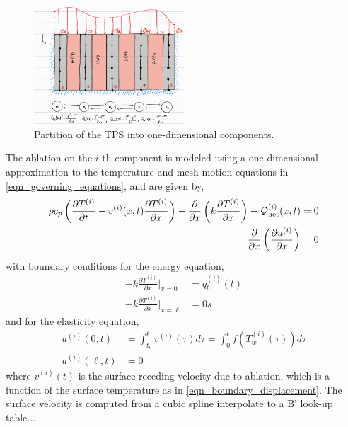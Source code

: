 \begin{figure}
    \centering
    \includegraphics[width=0.5\textwidth]{./figs/domain_partition.png}
    \caption{Partition of the TPS into one-dimensional components.}
    \label{fig_domain_partition}
\end{figure}

The ablation on the $i$-th component is modeled using a one-dimensional approximation to the temperature and mesh-motion equations in \cref{eqn_governing_equations}, and are given by,
\begin{subequations}
    \begin{align}
        \rho c_p\left(\frac{\partial T^{(i)}}{\partial t} - v^{(i)}(x,t)\frac{\partial T^{(i)}}{\partial x}\right) - \frac{\partial}{\partial x}\left(k\frac{\partial T^{(i)}}{\partial x}\right) - \mathcal{Q}^{(i)}_{\text{net}}(x,t) &= 0\label{eqn_thermal_1d}\\
        \frac{\partial}{\partial x}\left(\frac{\partial u^{(i)}}{\partial x}\right) &= 0\label{eqn_elasticity_1d}
    \end{align}\label{eqn_rpm}
\end{subequations}
with boundary conditions for the energy equation,
\begin{subequations}
    \begin{align}
        -k\frac{\partial T^{(i)}}{\partial x}\Bigg|_{x=0} &= q^{(i)}_b(t)\\
        -k\frac{\partial T^{(i)}}{\partial x}\Bigg|_{x=\ell} &= 0s
    \end{align}
\end{subequations}
and for the elasticity equation,
\begin{subequations}
    \begin{align}
        u^{(i)}(0,t) &= \int_{t_0}^{t}v^{(i)}(\tau)d\tau = \int_{0}^{t} f(T^{(i)}_w(\tau))d\tau\\
        u^{(i)}(\ell,t) &= 0
    \end{align}
\end{subequations}
where $v^{(i)}(t)$ is the surface receding velocity due to ablation, which is a function of the surface temperature as in \cref{eqn_boundary_displacement}. The surface velocity is computed from a cubic spline interpolate to a B' look-up table...

